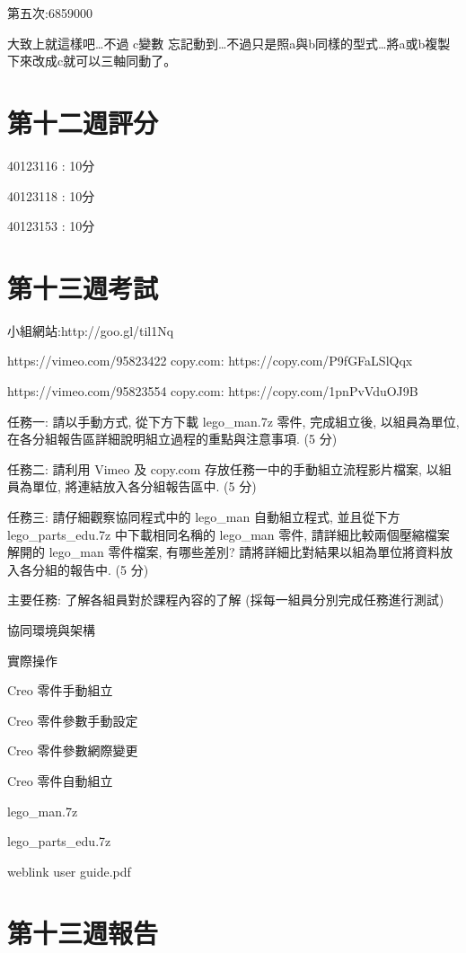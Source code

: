 \documentclass[]{article}
\begin{document}
第五次:6859000

大致上就這樣吧\ldots{}不過 c變數
忘記動到\ldots{}不過只是照a與b同樣的型式\ldots{}將a或b複製下來改成c就可以三軸同動了。

\section{第十二週評分}\label{ux7b2cux5341ux4e8cux9031ux8a55ux5206}

40123116 : 10分

40123118 : 10分

40123153 : 10分

\section{第十三週考試}\label{ux7b2cux5341ux4e09ux9031ux8003ux8a66}

小組網站:http://goo.gl/til1Nq

https://vimeo.com/95823422 copy.com: https://copy.com/P9fGFaLSlQqx

https://vimeo.com/95823554 copy.com: https://copy.com/1pnPvVduOJ9B

任務一: 請以手動方式, 從下方下載 lego\_man.7z 零件, 完成組立後,
以組員為單位, 在各分組報告區詳細說明組立過程的重點與注意事項. (5 分)

任務二: 請利用 Vimeo 及 copy.com 存放任務一中的手動組立流程影片檔案,
以組員為單位, 將連結放入各分組報告區中. (5 分)

任務三: 請仔細觀察協同程式中的 lego\_man 自動組立程式, 並且從下方
lego\_parts\_edu.7z 中下載相同名稱的 lego\_man 零件,
請詳細比較兩個壓縮檔案解開的 lego\_man 零件檔案, 有哪些差別?
請將詳細比對結果以組為單位將資料放入各分組的報告中. (5 分)

主要任務: 了解各組員對於課程內容的了解 (採每一組員分別完成任務進行測試)

協同環境與架構

實際操作

Creo 零件手動組立

Creo 零件參數手動設定

Creo 零件參數網際變更

Creo 零件自動組立

lego\_man.7z

lego\_parts\_edu.7z

weblink user guide.pdf

\section{第十三週報告}\label{ux7b2cux5341ux4e09ux9031ux5831ux544a}
\end{document}
